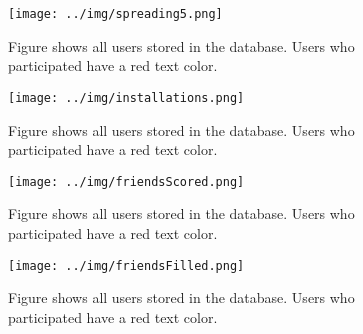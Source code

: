 \documentclass[preprint,12pt]{elsarticle}
\begin{document}
\begin{figure}
  \texttt{[image: ../img/spreading5.png]}
\caption{Figure shows all users stored in the database. Users who
  participated have a red text color.}
\label{fig:spreading}
\end{figure}

\begin{figure}
  \texttt{[image: ../img/installations.png]}
\caption{Figure shows all users stored in the database. Users who
  participated have a red text color.}
\label{fig:installations}
\end{figure}




\begin{figure}
  \texttt{[image: ../img/friendsScored.png]}
\caption{Figure shows all users stored in the database. Users who
  participated have a red text color.}
\label{fig:friendsScored}
\end{figure}

\begin{figure}
  \texttt{[image: ../img/friendsFilled.png]}
\caption{Figure shows all users stored in the database. Users who
  participated have a red text color.}
\label{fig:friendsFilled}
\end{figure}
\end{document}
